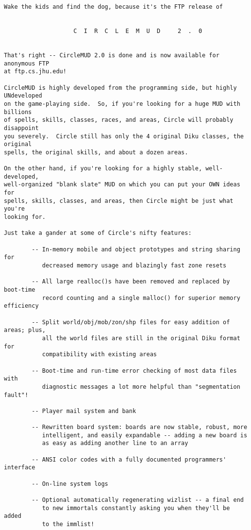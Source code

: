 \documentclass[11pt]{article}
\begin{document}
\begin{verbatim}
Wake the kids and find the dog, because it's the FTP release of


                    C  I  R  C  L  E  M  U  D     2  .  0


That's right -- CircleMUD 2.0 is done and is now available for anonymous FTP
at ftp.cs.jhu.edu!

CircleMUD is highly developed from the programming side, but highly UNdeveloped
on the game-playing side.  So, if you're looking for a huge MUD with billions
of spells, skills, classes, races, and areas, Circle will probably disappoint
you severely.  Circle still has only the 4 original Diku classes, the original
spells, the original skills, and about a dozen areas.

On the other hand, if you're looking for a highly stable, well-developed,
well-organized "blank slate" MUD on which you can put your OWN ideas for
spells, skills, classes, and areas, then Circle might be just what you're
looking for.

Just take a gander at some of Circle's nifty features:

        -- In-memory mobile and object prototypes and string sharing for
           decreased memory usage and blazingly fast zone resets

        -- All large realloc()s have been removed and replaced by boot-time
           record counting and a single malloc() for superior memory efficiency

        -- Split world/obj/mob/zon/shp files for easy addition of areas; plus,
           all the world files are still in the original Diku format for
           compatibility with existing areas

        -- Boot-time and run-time error checking of most data files with
           diagnostic messages a lot more helpful than "segmentation fault"!

        -- Player mail system and bank

        -- Rewritten board system: boards are now stable, robust, more
           intelligent, and easily expandable -- adding a new board is
           as easy as adding another line to an array

        -- ANSI color codes with a fully documented programmers' interface

        -- On-line system logs

        -- Optional automatically regenerating wizlist -- a final end
           to new immortals constantly asking you when they'll be added
           to the immlist!


\end{verbatim}
\end{document}
